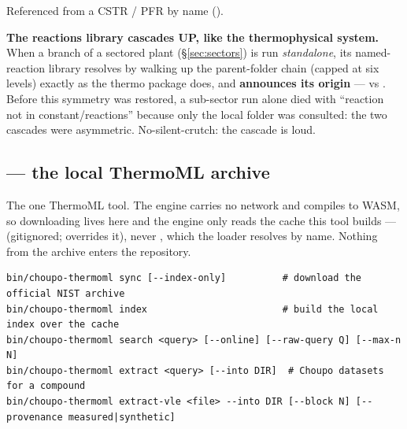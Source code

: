 \documentclass[11pt,a4paper]{article}
\begin{document}
Referenced from a CSTR / PFR by name
().

\begin{keyidea}
\textbf{The reactions library cascades UP, like the thermophysical
system.}  When a
branch of a sectored plant (\S\ref{sec:sectors}) is run \emph{standalone}, its
named-reaction library resolves by walking up the parent-folder chain (capped
at six levels) exactly as the thermo package does, and \textbf{announces its
origin} ---  vs .  Before this symmetry was restored, a sub-sector run alone died
with ``reaction not in constant/reactions'' because only the local folder was
consulted: the two cascades were asymmetric.  No-silent-crutch: the cascade is
loud.
\end{keyidea}


\subsection{ --- the local ThermoML archive}\label{sec:tool-thermoml}

The one ThermoML tool.  The engine carries no network and compiles to
WASM, so downloading lives here and the engine only reads the cache this
tool builds ---  (gitignored;
 overrides it), never
, which the loader resolves by name.  Nothing from the
archive enters the repository.

\begin{lstlisting}
bin/choupo-thermoml sync [--index-only]          # download the official NIST archive
bin/choupo-thermoml index                        # build the local index over the cache
bin/choupo-thermoml search <query> [--online] [--raw-query Q] [--max-n N]
bin/choupo-thermoml extract <query> [--into DIR]  # Choupo datasets for a compound
bin/choupo-thermoml extract-vle <file> --into DIR [--block N] [--provenance measured|synthetic]
\end{lstlisting}
\end{document}
